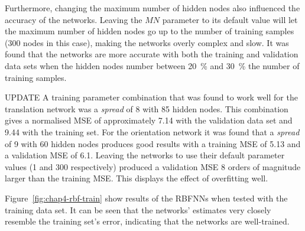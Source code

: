 Furthermore, changing the maximum number of hidden nodes also influenced the accuracy of the networks. Leaving the $\mathit{MN}$ parameter to its default value will let the maximum number of hidden nodes go up to the number of training samples (300 nodes in this case), making the networks overly complex and slow. It was found that the networks are more accurate with both the training and validation data sets when the hidden nodes number between 20~\% and 30~\% the number of training samples. 

UPDATE
A training parameter combination that was found to work well for the translation network was a \emph{spread} of 8 with 85 hidden nodes. This combination gives a normalised MSE of approximately 7.14 with the validation data set and 9.44 with the training set. For the orientation network it was found that a \emph{spread} of 9 with 60 hidden nodes produces good results with a training MSE of 5.13 and a validation MSE of 6.1. Leaving the networks to use their default parameter values (1 and 300 respectively) produced a validation MSE 8 orders of magnitude larger than the training MSE\@. This displays the effect of overfitting well. 

Figure~\ref{fig:chap4-rbf-train} show results of the RBFNNs when tested with the training data set. It can be seen that the networks' estimates very closely resemble the training set's error, indicating that the networks are well-trained. 


